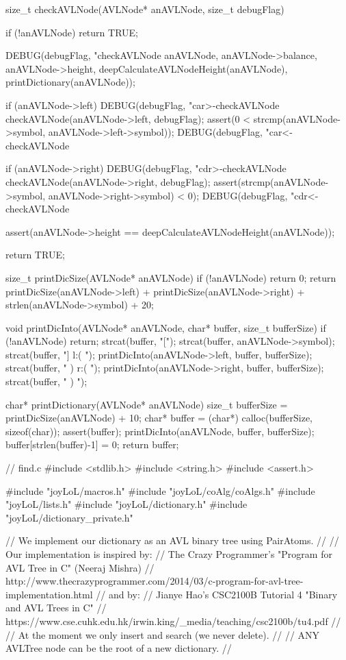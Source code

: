 size_t checkAVLNode(AVLNode* anAVLNode, size_t debugFlag) {
  if (!anAVLNode) return TRUE;

  DEBUG(debugFlag, "checkAVLNode %
        anAVLNode, anAVLNode->balance, anAVLNode->height,
        deepCalculateAVLNodeHeight(anAVLNode),
        printDictionary(anAVLNode));

  if (anAVLNode->left) {
    DEBUG(debugFlag, "car>-checkAVLNode %
    checkAVLNode(anAVLNode->left, debugFlag);
    assert(0 < strcmp(anAVLNode->symbol,
                      anAVLNode->left->symbol));
    DEBUG(debugFlag, "car<-checkAVLNode %
  }

  if (anAVLNode->right) {
    DEBUG(debugFlag, "cdr>-checkAVLNode %
    checkAVLNode(anAVLNode->right, debugFlag);
    assert(strcmp(anAVLNode->symbol,
                  anAVLNode->right->symbol) < 0);
    DEBUG(debugFlag, "cdr<-checkAVLNode %
  }

  assert(anAVLNode->height == deepCalculateAVLNodeHeight(anAVLNode));

  return TRUE;
}

size_t printDicSize(AVLNode* anAVLNode) {
  if (!anAVLNode) return 0;
  return printDicSize(anAVLNode->left)
    + printDicSize(anAVLNode->right)
    + strlen(anAVLNode->symbol) + 20;
}

void printDicInto(AVLNode* anAVLNode, char* buffer, size_t bufferSize) {
  if (!anAVLNode) return;
  strcat(buffer, "[");
  strcat(buffer, anAVLNode->symbol);
  strcat(buffer, "] l:( ");
  printDicInto(anAVLNode->left, buffer, bufferSize);
  strcat(buffer, " ) r:( ");
  printDicInto(anAVLNode->right, buffer, bufferSize);
  strcat(buffer, " ) ");
}

char* printDictionary(AVLNode* anAVLNode) {
  size_t bufferSize = printDicSize(anAVLNode) + 10;
  char* buffer = (char*) calloc(bufferSize, sizeof(char));
  assert(buffer);
  printDicInto(anAVLNode, buffer, bufferSize);
  buffer[strlen(buffer)-1] = 0;
  return buffer;
}
\stoptyping

\starttyping
// find.c
#include <stdlib.h>
#include <string.h>
#include <assert.h>

#include "joyLoL/macros.h"
#include "joyLoL/coAlg/coAlgs.h"
#include "joyLoL/lists.h"
#include "joyLoL/dictionary.h"
#include "joyLoL/dictionary_private.h"

// We implement our dictionary as an AVL binary tree using PairAtoms.
//
// Our implementation is inspired by:
// The Crazy Programmer's "Program for AVL Tree in C" (Neeraj Mishra)
// http://www.thecrazyprogrammer.com/2014/03/c-program-for-avl-tree-implementation.html
// and by:
// Jianye Hao's CSC2100B Tutorial 4 "Binary and AVL Trees in C"
// https://www.cse.cuhk.edu.hk/irwin.king/_media/teaching/csc2100b/tu4.pdf
//
// At the moment we only insert and search (we never delete).
//
// ANY AVLTree node can be the root of a new dictionary.
//

